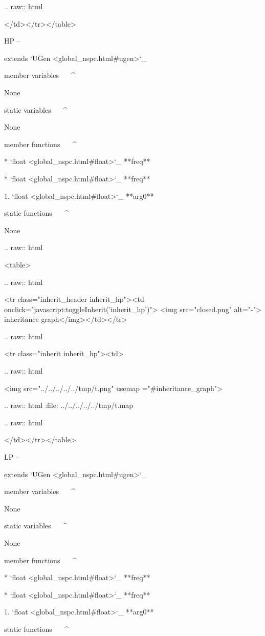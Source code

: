   .. raw:: html

   </td></tr></table>

HP
--

extends `UGen <global_nspc.html#ugen>`_ 

member variables
^^^^^^^^^^^^^^^^

	None

static variables
^^^^^^^^^^^^^^^^

	None

member functions
^^^^^^^^^^^^^^^^

	* `float <global_nspc.html#float>`_ **freq**

	* `float <global_nspc.html#float>`_ **freq**

		1. `float <global_nspc.html#float>`_ **arg0**

static functions
^^^^^^^^^^^^^^^^


	None


  .. raw:: html

   <table>


  .. raw:: html

   <tr class="inherit_header inherit_hp"><td onclick="javascript:toggleInherit('inherit_hp')"> <img src="closed.png" alt="-"> inheritance graph</img></td></tr>


  .. raw:: html

   <tr class="inherit inherit_hp"><td>


  .. raw:: html

   <img src="../../../../../tmp/t.png" usemap ="#inheritance_graph">


  .. raw:: html
   :file:   ../../../../../tmp/t.map


  .. raw:: html

   </td></tr></table>

LP
--

extends `UGen <global_nspc.html#ugen>`_ 

member variables
^^^^^^^^^^^^^^^^

	None

static variables
^^^^^^^^^^^^^^^^

	None

member functions
^^^^^^^^^^^^^^^^

	* `float <global_nspc.html#float>`_ **freq**

	* `float <global_nspc.html#float>`_ **freq**

		1. `float <global_nspc.html#float>`_ **arg0**

static functions
^^^^^^^^^^^^^^^^


